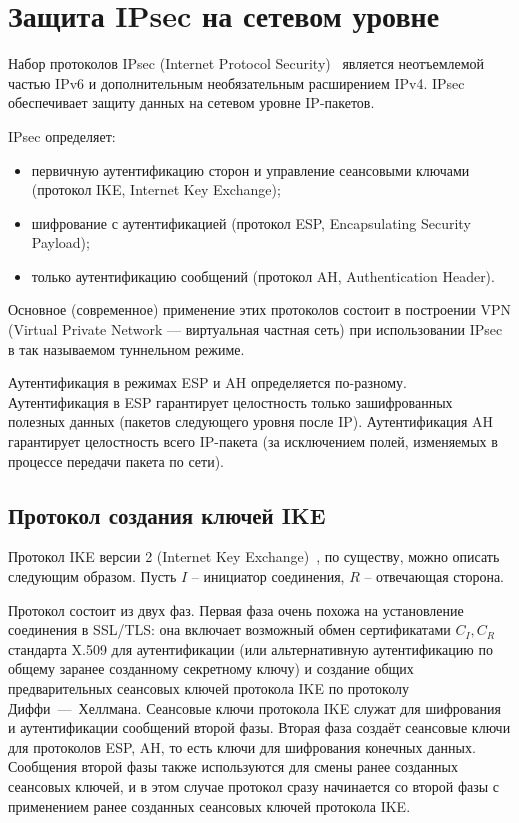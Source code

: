 \section{Защита IPsec на сетевом уровне}

Набор протоколов IPsec (Internet Protocol Security)~\cite{rfc4301} является неотъемлемой частью IPv6 и дополнительным необязательным расширением IPv4. IPsec обеспечивает защиту данных на сетевом уровне IP-пакетов.

IPsec определяет:
\begin{itemize}
    \item первичную аутентификацию сторон и управление сеансовыми ключами (протокол IKE, Internet Key Exchange);
    \item шифрование с аутентификацией (протокол ESP, Encapsulating Security Payload);
    \item только аутентификацию сообщений (протокол AH, Authentication Header).
\end{itemize}
Основное (современное) применение этих протоколов состоит в построении VPN (Virtual Private Network --- виртуальная частная сеть) при использовании IPsec в так называемом туннельном режиме.

Аутентификация в режимах ESP и AH определяется по-разному. Аутентификация в ESP гарантирует целостность только зашифрованных полезных данных (пакетов следующего уровня после IP). Аутентификация AH гарантирует целостность всего IP-пакета (за исключением полей, изменяемых в процессе передачи пакета по сети).

\subsection{Протокол создания ключей IKE}


Протокол IKE версии 2 (Internet Key Exchange)~\cite{rfc4306}, по существу, можно описать следующим образом. Пусть $I$ -- инициатор соединения, $R$ -- отвечающая сторона.

Протокол состоит из двух фаз. Первая фаза очень похожа на установление соединения в SSL/TLS: она включает возможный обмен сертификатами $C_I, C_R$ стандарта X.509 для аутентификации (или альтернативную аутентификацию по общему заранее созданному секретному ключу) и создание общих предварительных сеансовых ключей протокола IKE по протоколу Диффи~---~Хеллмана. Сеансовые ключи протокола IKE служат для шифрования и аутентификации сообщений второй фазы. Вторая фаза создаёт сеансовые ключи для протоколов ESP, AH, то есть ключи для шифрования конечных данных. Сообщения второй фазы также используются для смены ранее созданных сеансовых ключей, и в этом случае протокол сразу начинается со второй фазы с применением ранее созданных сеансовых ключей протокола IKE.

